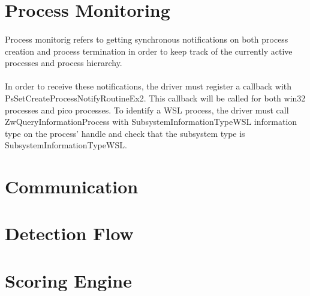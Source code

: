     \paragraph{}
    

    \section{Process Monitoring}
        \paragraph{}
        Process monitorig refers to getting synchronous notifications on both process creation and process termination in order to keep track
        of the currently active processes and process hierarchy.

        \paragraph{}
        In order to receive these notifications, the driver must register a callback with PsSetCreateProcessNotifyRoutineEx2. This callback will
        be called for both win32 processes and pico processes. To identify a WSL process, the driver must call ZwQueryInformationProcess with
        SubsystemInformationTypeWSL information type on the process' handle and check that the subsystem type is SubsystemInformationTypeWSL.
    
    \section{Communication}

    \section{Detection Flow}

    \section{Scoring Engine}
